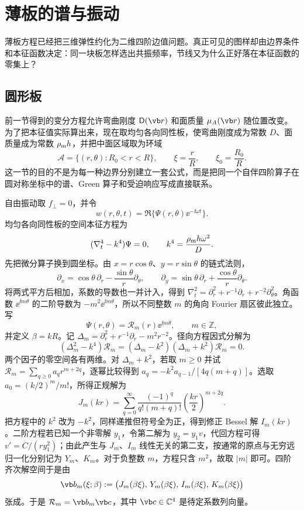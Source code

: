 \section{薄板的谱与振动}
\label{chap:phys-sm-thin-plate-chladni}

薄板方程已经把三维弹性约化为二维四阶边值问题。真正可见的图样却由边界条件和本征函数决定：同一块板怎样选出共振频率，节线又为什么正好落在本征函数的零集上？

\subsection{圆形板}
\label{sec:phys-sm-eigenvalue}

前一节得到的变分方程允许弯曲刚度 \(\mathsf D(\vb r)\) 和面质量 \(\mu_A(\vb r)\) 随位置改变。为了把本征值实际算出来，现在取均匀各向同性板，使弯曲刚度成为常数 \(D\)、面质量成为常数 \(\rho_{\rm m} h\)，并把中面区域取为环域
\[
 \mathcal A=\{(r,\theta):R_0<r<R\},
 \qquad
 \xi=\frac rR,
 \qquad
 \xi_0=\frac{R_0}{R}.
\]
这一节的目的不是为每一种边界分别建立一套公式，而是把同一个自伴四阶算子在圆对称坐标中的谱、Green 算子和受迫响应写成直接联系。

自由振动取 \(f_\perp=0\)，并令
\[
 w(r,\theta,t)=\Re\{\Psi(r,\theta)\ee^{-\ii\omega t}\}.
\]
均匀各向同性板的空间本征方程为
\begin{equation}
 (\nabla_t^4-k^4)\Psi=0,
 \qquad
 k^4=\frac{\rho_{\rm m} h\omega^2}{D}.
 \label{eq:phys-sm-annulus-eigenproblem}
\end{equation}
先把微分算子换到圆坐标。由 \(x=r\cos\theta\)、\(y=r\sin\theta\) 的链式法则，
\[
 \partial_x=\cos\theta\,\partial_r-\frac{\sin\theta}{r}\partial_\theta,
 \qquad
 \partial_y=\sin\theta\,\partial_r+\frac{\cos\theta}{r}\partial_\theta.
\]
将两式平方后相加，系数的导数也一并计入，得到
\(\nabla_t^2=\partial_r^2+r^{-1}\partial_r+r^{-2}\partial_\theta^2\)。角函数 \(\ee^{\ii m\theta}\) 的二阶导数为 \(-m^2\ee^{\ii m\theta}\)，所以不同整数 \(m\) 的角向 Fourier 扇区彼此独立。写
\[
 \Psi(r,\theta)=\mathcal R_m(r)\ee^{\ii m\theta},
 \qquad m\in\mathbb Z,
\]
并定义 \(\beta=kR\)。记
\(\Delta_m=\partial_r^2+r^{-1}\partial_r-m^2r^{-2}\)。径向方程因式分解为
\[
 (\Delta_m^2-k^4)\mathcal R_m
 =(\Delta_m-k^2)(\Delta_m+k^2)\mathcal R_m=0.
\]
两个因子的零空间各有两维。对 \(\Delta_m+k^2\)，若取 \(m\ge0\) 并试 \(\mathcal R_m=\sum_{q\ge0}a_qr^{m+2q}\)，逐幂比较得到
\(a_q=-k^2a_{q-1}/[4q(m+q)]\)。选取 \(a_0=(k/2)^m/m!\)，所得正规解为
\[
 J_m(kr)=\sum_{q=0}^\infty
 \frac{(-1)^q}{q!(m+q)!}\left(\frac{kr}{2}\right)^{m+2q}.
\]
把方程中的 \(k^2\) 改为 \(-k^2\)，同样递推但符号全为正，得到修正 Bessel 解 \(I_m(kr)\)。二阶方程若已知一个非零解 \(y_1\)，令第二解为 \(y_2=y_1v\)，代回方程可得 \(v'=C/(r y_1^2)\)；由此产生与 \(J_m\)、\(I_m\) 线性无关的第二支，按通常的原点与无穷远归一化分别记为 \(Y_m\)、\(K_m\)。对于负整数 \(m\)，方程只含 \(m^2\)，故取 \(|m|\) 即可。四阶齐次解空间于是由
\begin{equation}
 \vb b_m(\xi;\beta)
 :=\bigl(J_m(\beta\xi),\,Y_m(\beta\xi),\,I_m(\beta\xi),\,K_m(\beta\xi)\bigr)
 \label{eq:phys-sm-annulus-radial-basis}
\end{equation}
张成。于是 \(\mathcal R_m=\vb b_m\vb c\)，其中 \(\vb c\in\mathbb C^4\) 是待定系数列向量。

